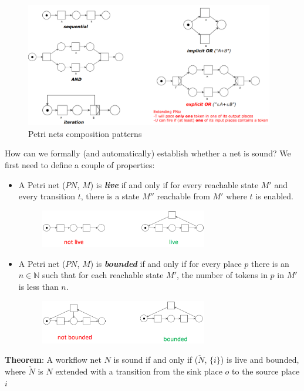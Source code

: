 \begin{figure} [H]
    \centering
    \includegraphics[width=0.97\textwidth]{images/BusinessProcessModeling/composition-patterns.PNG}
    \caption{Petri nets composition patterns}
    \label{fig:composition-patterns}
\end{figure} 

\noindent How can we formally (and automatically) establish whether a net is sound? We first need to define a couple of properties:
\begin{itemize}
    \item A Petri net ($PN$, $M$) is \textbf{\textit{live}} if and only if for every reachable state $M'$ and every transition $t$, there is a state $M''$ reachable from $M'$ where $t$ is enabled.
    \begin{figure} [H]
    \centering
    \includegraphics[width=0.69\textwidth]{images/BusinessProcessModeling/live.PNG}
    \end{figure} 
    \item A Petri net ($PN$, $M$) is \textbf{\textit{bounded}} if and only if for every place $p$ there is an $n \in \mathbb{N}$ such that for each reachable state $M'$, the number of tokens in $p$ in $M'$ is less than $n$.
    \begin{figure} [H]
    \centering
    \includegraphics[width=0.69\textwidth]{images/BusinessProcessModeling/bounded.PNG}
    \end{figure} 
\end{itemize}

\noindent \textbf{Theorem}: A workflow net $N$ is sound if and only if ($\check{N}$, $\{i\}$) is live and bounded, where $\check{N}$ is $N$ extended with a transition from the sink place $o$ to the source place $i$
